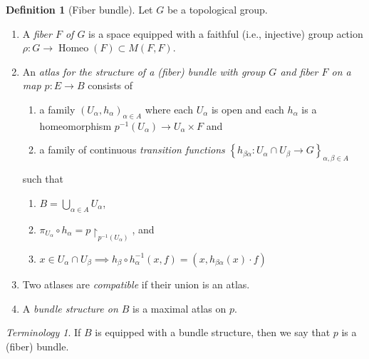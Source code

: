\documentclass[10pt,letterpaper,cm]{nupset}
\theoremstyle{definition}
\newtheorem{defn}{Definition}[subsection]
\theoremstyle{theorem}
\theoremstyle{remark}
\newtheorem*{term}{Terminology}
\newcommand{\1}{\mathbb{1}}
\newcommand{\0}{\vec 0}
\DeclareMathOperator{\homeo}{Homeo}
\newcommand{\be}{\begin{enumerate}}
\newcommand{\ee}{\end{enumerate}}
\begin{document}
\begin{defn}[Fiber bundle] Let $G$ be a topological group.
\be 
\item A \textit{fiber $F$ of $G$} is a space equipped with a faithful (i.e., injective) group action $\rho : G \to \homeo(F) \subset M(F, F)$. 
\item An \textit{atlas for the structure of a (fiber) bundle with group $G$ and fiber $F$ on a map $p: E \to B$} consists of 
\be
\item a family $\left(U_{\alpha}, h_{\alpha}\right)_{\alpha \in A}$ where each $U_{\alpha}$ is open and each $h_{\alpha}$ is a homeomorphism $p^{-1}(U_{\alpha}) \to U_{\alpha} \times F$ and
\item  a family of continuous \textit{transition functions} $\left\{h_{\beta{\alpha}} : U_{\alpha} \cap U_{\beta} \to G\right\}_{\alpha, \beta \in A}$ 
\ee such that
\be[label= \roman*]
\item $B = \bigcup_{\alpha \in A} U_{\alpha}$,
\item $\pi_{U_{\alpha}} \circ h_{\alpha} = p\restriction_{p^{-1}(U_{\alpha})}$, and
\item  $x\in U_{\alpha} \cap U_{\beta} \implies h_{\beta} \circ h_{\alpha}^{-1}(x,f) = \left(x, h_{\beta{\alpha}}(x)\cdot f\right)$
\ee
\item Two atlases are \textit{compatible} if their union is an atlas. 
\item A \textit{bundle structure on $B$} is a maximal atlas on $p$. 
\ee
\end{defn}

\begin{term}
If $B$ is equipped with a bundle structure, then we say that $p$ is a (fiber) bundle.
\end{term}
\end{document}
